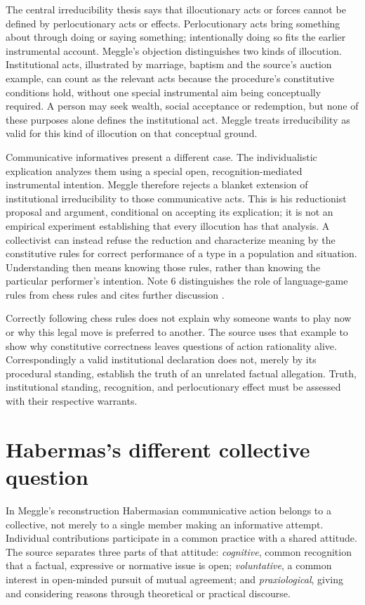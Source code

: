 The central irreducibility thesis says that illocutionary acts or forces
cannot be defined by perlocutionary acts or effects. Perlocutionary acts
bring something about through doing or saying something; intentionally
doing so fits the earlier instrumental account. Meggle's objection
distinguishes two kinds of illocution. Institutional acts, illustrated
by marriage, baptism and the source's auction example, can count as the relevant acts
because the procedure's constitutive conditions hold, without one special
instrumental aim being conceptually required. A person may seek wealth,
social acceptance or redemption, but none of these purposes alone defines
the institutional act. Meggle treats irreducibility as valid for this
kind of illocution on that conceptual ground.

Communicative informatives present a different case. The individualistic
explication analyzes them using a special open, recognition-mediated
instrumental intention. Meggle therefore rejects a blanket extension of
institutional irreducibility to those communicative acts. This is his
reductionist proposal and argument, conditional on accepting its
explication; it is not an empirical experiment establishing that every
illocution has that analysis. A collectivist can instead refuse the
reduction and characterize meaning by the constitutive rules for correct
performance of a type in a population and situation. Understanding then
means knowing those rules, rather than knowing the particular performer's
intention. Note 6 distinguishes the role of language-game rules from
chess rules and cites further discussion
\cite[pp.~605--606; p.~609, nn.~5--6]{Meggle2021RationalityCommunication}.

Correctly following chess rules does not explain why someone wants to
play now or why this legal move is preferred to another. The source uses
that example to show why constitutive correctness leaves questions of
action rationality alive. Correspondingly a valid institutional declaration
does not, merely by its procedural standing, establish the truth of an
unrelated factual allegation. Truth, institutional standing, recognition,
and perlocutionary effect must be assessed with their respective warrants.

\section{Habermas's different collective question}

In Meggle's reconstruction Habermasian communicative action belongs to
a collective, not merely to a single member making an informative attempt.
Individual contributions participate in a common practice with a shared
attitude. The source separates three parts of that attitude:
\emph{cognitive}, common recognition that a factual, expressive or normative
issue is open; \emph{voluntative}, a common interest in open-minded pursuit
of mutual agreement; and \emph{praxiological}, giving and considering
reasons through theoretical or practical discourse.

